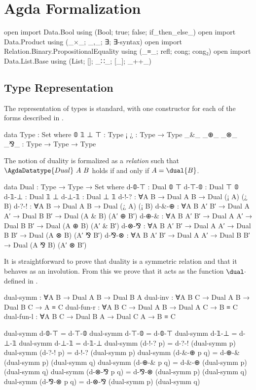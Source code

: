 \section{Agda Formalization}
\label{sec:formalization}

\begin{code}[hide]
open import Data.Bool using (Bool; true; false; if_then_else_)
open import Data.Product using (_×_; _,_; ∃; ∃-syntax)
open import Relation.Binary.PropositionalEquality using (_≡_; refl; cong; cong₂)
open import Data.List.Base using (List; []; _∷_; [_]; _++_)
\end{code}

\subsection{Type Representation}
\label{sec:type-agda}

The representation of types is standard, with one constructor for each of the
forms described in .

\begin{code}
data Type : Set where
  𝟘 𝟙 ⊥ ⊤          : Type
  ¡ ¿              : Type → Type
  _&_ _⊕_ _⊗_ _⅋_  : Type → Type → Type
\end{code}

The notion of duality is formalized as a \emph{relation} 
such that $\AgdaDatatype{Dual}~A~B$ holds if and only if $A = \dual{B}$.

\begin{code}
data Dual : Type → Type → Set where
  d-𝟘-⊤  : Dual 𝟘 ⊤
  d-⊤-𝟘  : Dual ⊤ 𝟘
  d-𝟙-⊥  : Dual 𝟙 ⊥
  d-⊥-𝟙  : Dual ⊥ 𝟙
  d-!-?  : ∀{A B} → Dual A B → Dual (¡ A) (¿ B)
  d-?-!  : ∀{A B} → Dual A B → Dual (¿ A) (¡ B)
  d-&-⊕  : ∀{A B A′ B′} → Dual A A′ → Dual B B′ → Dual (A & B) (A′ ⊕ B′)
  d-⊕-&  : ∀{A B A′ B′} → Dual A A′ → Dual B B′ → Dual (A ⊕ B) (A′ & B′)
  d-⊗-⅋  : ∀{A B A′ B′} → Dual A A′ → Dual B B′ → Dual (A ⊗ B) (A′ ⅋ B′)
  d-⅋-⊗  : ∀{A B A′ B′} → Dual A A′ → Dual B B′ → Dual (A ⅋ B) (A′ ⊗ B′)
\end{code}

It is straightforward to prove that duality is a symmetric relation and that it
behaves as an involution. From this we prove that it acts as the function
$\dual\cdot$ defined in .

\begin{code}
dual-symm   : ∀{A B} → Dual A B → Dual B A
dual-inv    : ∀{A B C} → Dual A B → Dual B C → A ≡ C
dual-fun-r  : ∀{A B C} → Dual A B → Dual A C → B ≡ C
dual-fun-l  : ∀{A B C} → Dual B A → Dual C A → B ≡ C
\end{code}
\begin{code}[hide]
dual-symm d-𝟘-⊤ = d-⊤-𝟘
dual-symm d-⊤-𝟘 = d-𝟘-⊤
dual-symm d-𝟙-⊥ = d-⊥-𝟙
dual-symm d-⊥-𝟙 = d-𝟙-⊥
dual-symm (d-!-? p) = d-?-! (dual-symm p)
dual-symm (d-?-! p) = d-!-? (dual-symm p)
dual-symm (d-&-⊕ p q) = d-⊕-& (dual-symm p) (dual-symm q)
dual-symm (d-⊕-& p q) = d-&-⊕ (dual-symm p) (dual-symm q)
dual-symm (d-⊗-⅋ p q) = d-⅋-⊗ (dual-symm p) (dual-symm q)
dual-symm (d-⅋-⊗ p q) = d-⊗-⅋ (dual-symm p) (dual-symm q)
\end{code}


